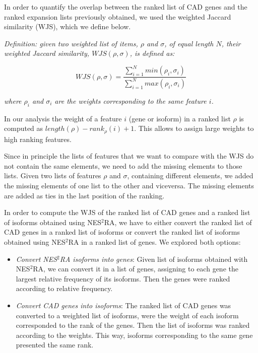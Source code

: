 \documentclass[fleqn,10pt]{SelfArx} %
\begin{document}
In order to quantify the overlap between the ranked list of CAD genes and the ranked expansion lists previously obtained, we used the weighted Jaccard similarity (WJS), which we define below.\medskip

\noindent
\textit{Definition: given two weighted list of items, $\rho$ and $\sigma$, of equal length $N$, their weighted Jaccard similarity, $WJS(\rho, \sigma)$, is defined as:}

$$
WJS(\rho, \sigma) = \dfrac{\sum_{i=1}^Nmin(\rho_i,\sigma_i)}{\sum_{i=1}^Nmax(\rho_i,\sigma_i)}
$$

\noindent
\textit{where $\rho_i$ and $\sigma_i$ are the weights corresponding to the same feature $i$.}\medskip

In our analysis the weight of a feature $i$ (gene or isoform) in a ranked list $\rho$ is computed as $length(\rho) - rank_{\rho}(i) + 1$. This allows to assign large weights to high ranking features.

Since in principle the lists of features that we want to compare with the WJS do not contain the same elements, we need to add the missing elements to those lists. Given two lists of features $\rho$ and $\sigma$, containing different elements, we added the missing elements of one list to the other and viceversa. The missing elements are added as ties in the last position of the ranking.

In order to compute the WJS of the ranked list of CAD genes and a ranked list of isoforms obtained using NES$^2$RA, we have to either convert the ranked list of CAD genes in a ranked list of isoforms or convert the ranked list of isoforms obtained using NES$^2$RA in a ranked list of genes. We explored both options:

\begin{itemize}[leftmargin=*]
	\item \textit{Convert NES$^2$RA isoforms into genes}: Given list of isoforms obtained with NES$^2$RA, we can convert it in a list of genes, assigning to each gene the largest relative frequency of its isoforms. Then the genes were ranked according to relative frequency.
	\item \textit{Convert CAD genes into isoforms}: The ranked list of CAD genes was converted to a weighted list of isoforms, were the weight of each isoform corresponded to the rank of the genes. Then the list of isoforms was ranked according to the weights. This way, isoforms corresponding to the same gene presented the same rank.
\end{itemize}
\end{document}
